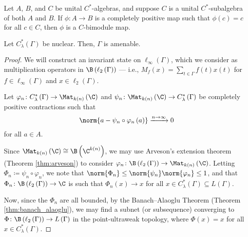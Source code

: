 \begin{corollary}\label{cor:multiplicative_domain}
  Let $A$, $B$, and $C$ be unital $C^{\ast}$-algebras, and suppose $C$ is a unital $C^{\ast}$-subalgebra of both $A$ and $B$. If $\phi\colon A\rightarrow B$ is a completely positive map such that $\phi(c) = c$ for all $c\in C$, then $\phi$ is a $C$-bimodule map.
\end{corollary}
\begin{theorem}\label{thm:nuclearity_implies_amenability}
  Let $C^{\ast}_{\lambda}\left( \Gamma \right)$ be nuclear. Then, $\Gamma$ is amenable.
\end{theorem}
\begin{proof}
  We will construct an invariant state on $\ell_{\infty}\left( \Gamma \right)$, which we consider as multiplication operators in $\B\left( \ell_2\left( \Gamma \right) \right)$ --- i.e., $M_{f}(x) = \sum_{t\in\Gamma}f(t)x(t)$ for $f\in \ell_{\infty}\left( \Gamma \right)$ and $x\in \ell_2\left( \Gamma \right)$.\newline

  Let $\varphi_n\colon C^{\ast}_{\lambda}\left( \Gamma \right)\rightarrow \Mat_{k(n)}\left( \C \right)$ and $\psi_n\colon \Mat_{k(n)}\left( \C \right)\rightarrow C^{\ast}_{\lambda}\left( \Gamma \right)$ be completely positive contractions such that
  \begin{align*}
    \norm{a - \psi_n\circ\varphi_n\left( a \right)}\xrightarrow{n\rightarrow\infty} 0
  \end{align*}
  for all $a\in A$.\newline

  Since $\Mat_{k(n)}\left( \C \right) \cong \B\left( \C^{k(n)} \right)$, we may use Arveson's extension theorem (Theorem \ref{thm:arveson}) to consider $\varphi_n\colon \B\left( \ell_2\left( \Gamma \right) \right)\rightarrow \Mat_{k(n)}\left( \C \right)$. Letting $\Phi_{n}\coloneq \psi_n\circ\varphi_n$, we note that $\norm{\Phi_n}\leq \norm{\psi_n}\norm{\varphi_n}\leq 1$, and that $\Phi_n\colon \B\left( \ell_2\left( \Gamma \right) \right)\rightarrow \C$ is such that $\Phi_n\left( x \right)\rightarrow x$ for all $x\in C^{\ast}_{\lambda}\left( \Gamma \right)\subseteq L\left( \Gamma \right)$.\newline

  Now, since the $\Phi_n$ are all bounded, by the Banach--Alaoglu Theorem (Theorem \ref{thm:banach_alaoglu}), we may find a subnet (or subsequence) converging to $\Phi\colon \B\left( \ell_2\left( \Gamma \right) \right)\rightarrow L\left( \Gamma \right)$ in the point-ultraweak topology, where $\Phi(x) = x$ for all $x\in C^{\ast}_{\lambda}\left( \Gamma \right)$.\newline


\end{proof}
